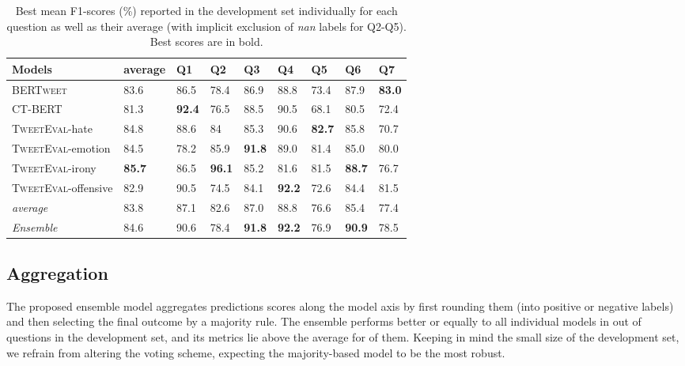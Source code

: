 \documentclass[11pt,a4paper]{article}
\begin{document}
\begin{table*}[!h]
    \centering
    \small
    \renewcommand{\arraystretch}{1.05}
\begin{tabularx}{0.95\textwidth}{@{}LMMMMMMMM@{}}
    {\textbf{Models}} & \textbf{average} & \textbf{Q1} & \textbf{Q2} & \textbf{Q3} & \textbf{Q4} & \textbf{Q5} & \textbf{Q6} & \textbf{Q7} \\
    \toprule
    \textsc{BERTweet } &83.6&86.5&78.4&86.9&88.8&73.4&87.9&\textbf{83.0}\\ 
    \textsc{CT-BERT} &81.3&\textbf{92.4}&76.5&88.5&90.5&68.1&80.5&72.4 \\
    \textsc{TweetEval}-hate &84.8&88.6&84&85.3&90.6&\textbf{82.7}&85.8&70.7 \\
    \textsc{TweetEval}-emotion &84.5&78.2&85.9&\textbf{91.8}&89.0&81.4&85.0&80.0 \\
    \textsc{TweetEval}-irony &\textbf{85.7}&86.5&\textbf{96.1}&85.2&81.6&81.5&\bf88.7&76.7 \\
    \textsc{TweetEval}-offensive &82.9&90.5&74.5&84.1&\textbf{92.2}&72.6&84.4&81.5 \\
    \midrule
    \emph{average} & 83.8 & 87.1 & 82.6 & 87.0 & 88.8 & 76.6 & 85.4 & 77.4\\
    \midrule 
    \emph{Ensemble} &84.6&90.6&78.4&\textbf{91.8}&\textbf{92.2}&76.9&\textbf{90.9}&78.5 \\
    \bottomrule
\end{tabularx}    \caption{Best mean F1-scores (\%) reported in the development set individually for each question as well as their average (with implicit exclusion of \textit{nan} labels for Q2-Q5). Best scores are in bold.}
    \label{tab:results}
\end{table*}

\subsection{Aggregation}
The proposed ensemble model aggregates predictions scores along the 
model axis by first rounding them (into positive or negative labels) and then selecting the final outcome by a majority rule.
The ensemble performs better or equally to all individual models in  out of  questions in the development set, and its metrics lie above the average for  of them.
Keeping in mind the small size of the development set, we refrain from altering the voting scheme, expecting the majority-based model to be the most robust.
\end{document}
